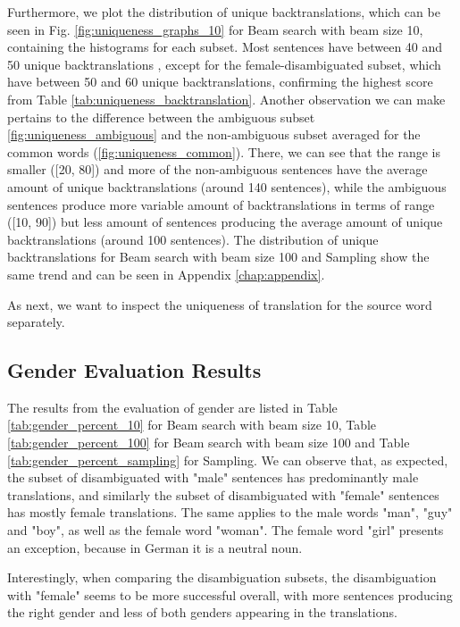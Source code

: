 Furthermore, we plot the distribution of unique backtranslations, which can be seen in Fig. \ref{fig:uniqueness_graphs_10} for Beam search with beam size 10, containing the histograms for each subset. 
Most sentences have between 40 and 50 unique backtranslations , except for the female-disambiguated subset, which have between 50 and 60 unique backtranslations, confirming the highest score from Table \ref{tab:uniqueness_backtranslation}. Another observation we can make pertains to the difference between the ambiguous subset \ref{fig:uniqueness_ambiguous} and the non-ambiguous subset averaged for the common words (\ref{fig:uniqueness_common}). There, we can see that the range is smaller ([20, 80]) and more of the non-ambiguous sentences have the average amount of unique backtranslations (around 140 sentences), while the ambiguous sentences produce more variable amount of backtranslations in terms of range  ([10, 90]) but less amount of sentences producing the average amount of unique backtranslations (around 100 sentences).
The distribution of unique backtranslations for Beam search with beam size 100 and Sampling show the same trend and can be seen in Appendix \ref{chap:appendix}.

As next, we want to inspect the uniqueness of translation for the source word separately.

\subsection{Gender Evaluation Results}
\label{ch:Base_Experiment:Results:Gender}

The results from the evaluation of gender are listed in Table \ref{tab:gender_percent_10} for Beam search with beam size 10, Table \ref{tab:gender_percent_100} for Beam search with beam size 100 and Table \ref{tab:gender_percent_sampling} for Sampling. We can observe that, as expected, the subset of disambiguated with "male" sentences has predominantly male translations, and similarly the subset of disambiguated with "female" sentences has mostly female translations. The same applies to the male words "man", "guy" and "boy", as well as the female word "woman". The female word "girl" presents an exception, because in German it is a neutral noun.

Interestingly, when comparing the disambiguation subsets, the disambiguation with "female" seems to be more successful overall, with more sentences producing the right gender and less of both genders appearing in the translations.


